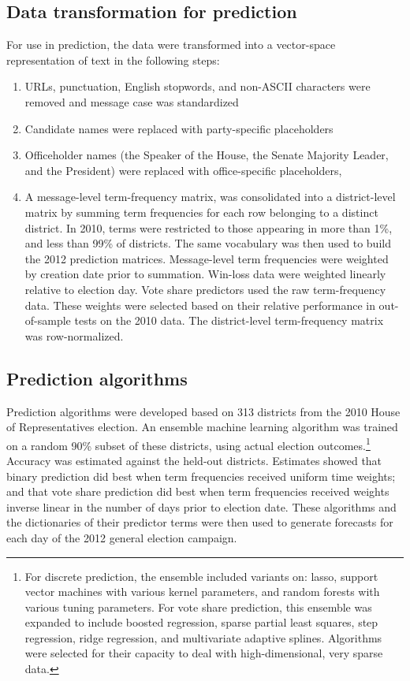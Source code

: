 \documentclass{acm_proc_article-sp}
\begin{document}


\subsection{Data transformation for prediction}
\label{sec:data-transf-pred}

For use in prediction, the data were transformed into a vector-space
representation of text in the following steps:
\begin{enumerate}
\item URLs, punctuation, English stopwords, and non-ASCII characters were removed and
  message case was standardized
\item Candidate names were replaced with party-specific placeholders
\item Officeholder names (the Speaker of the House, the Senate
  Majority Leader, and the President) were replaced with
  office-specific placeholders,
\item A message-level term-frequency matrix,
  was consolidated into a district-level matrix by summing term
  frequencies for each row belonging to a distinct district. In 2010,
  terms were restricted to those appearing in more than 1\%, and less
  than 99\% of districts. The same vocabulary was then used to build
  the 2012 prediction matrices. Message-level term frequencies were
  weighted by creation date prior to summation. Win-loss data were
   weighted linearly relative to election
  day. Vote share 
  predictors used the raw term-frequency data. These weights were
  selected based on their relative performance in out-of-sample tests
  on the 2010 data. The district-level term-frequency matrix was row-normalized.
\end{enumerate}

\subsection{Prediction algorithms}
\label{sec:pred-algor}

Prediction algorithms were developed based on 313 districts from the 2010 House of
Representatives election. An ensemble machine learning
algorithm \cite{van2007super} was trained on a random 90\% subset of
these districts, using actual election outcomes.\footnote{For discrete
  prediction, the ensemble
included variants on: lasso, support vector machines with various
kernel parameters, and random forests with various tuning
parameters. For vote share prediction, this ensemble was expanded to
include boosted regression, sparse partial least squares, step
regression, ridge regression, and multivariate adaptive splines. Algorithms were selected for their capacity to deal with
high-dimensional, very sparse data.} Accuracy was
estimated against the held-out districts. Estimates showed that binary
prediction did best when term frequencies received uniform time
weights; and that vote share prediction did best when term frequencies
received weights inverse linear in the number of days prior to
election date. These algorithms and the dictionaries of their
predictor terms were then used to generate forecasts for each day of
the 2012 general election campaign.
\end{document}
